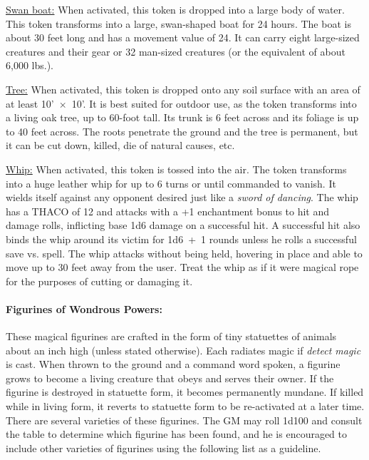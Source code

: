 \begin{multicols}{2}
\underline{Swan boat:} When activated, this token is dropped into a large body of water.  This token transforms into a large, swan-shaped boat for 24 hours.  The boat is about 30 feet long and has a movement value of 24.  It can carry eight large-sized creatures and their gear or 32 man-sized creatures (or the equivalent of about 6,000 lbs.). 

\underline{Tree:} When activated, this token is dropped onto any soil surface with an area of at least 10'~$\times$~10'.  It is best suited for outdoor use, as the token transforms into a living oak tree, up to 60-foot tall.  Its trunk is 6 feet across and its foliage is up to 40 feet across.  The roots penetrate the ground and the tree is permanent, but it can be cut down, killed, die of natural causes, etc.

\underline{Whip:} When activated, this token is tossed into the air.  The token transforms into a huge leather whip for up to 6 turns or until commanded to vanish.  It wields itself against any opponent desired just like a \textit{sword of dancing}.  The whip has a THACO of 12 and attacks with a +1 enchantment bonus to hit and damage rolls, inflicting base 1d6 damage on a successful hit.  A successful hit also binds the whip around its victim for 1d6~+~1 rounds unless he rolls a successful save vs. spell.  The whip attacks without being held, hovering in place and able to move up to 30 feet away from the user.  Treat the whip as if it were magical rope for the purposes of cutting or damaging it.
 
\paragraph{Figurines of Wondrous Powers:} These magical figurines are crafted in the form of tiny statuettes of animals about an inch high (unless stated otherwise).  Each radiates magic if \textit{detect magic} is cast.  When thrown to the ground and a command word spoken, a figurine grows to become a living creature that obeys and serves their owner.  If the figurine is destroyed in statuette form, it becomes permanently mundane.  If killed while in living form, it reverts to statuette form to be re-activated at a later time.  There are several varieties of these figurines.  The GM may roll 1d100 and consult the table to determine which figurine has been found, and he is encouraged to include other varieties of figurines using the following list as a guideline.


\end{multicols}
